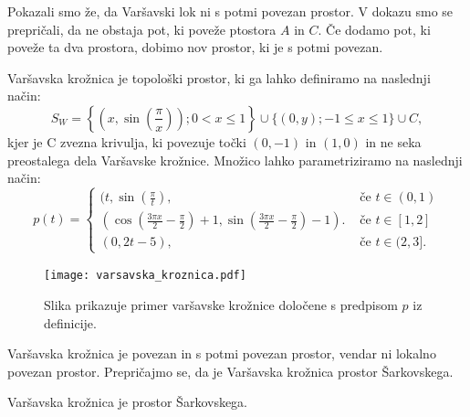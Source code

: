 \documentclass[../TG_magistrsko_delo_sections.tex]{subfiles}
\begin{document}
Pokazali smo že, da Varšavski lok ni s potmi povezan prostor. V dokazu smo se prepričali, da ne obstaja pot, ki poveže ptostora $A$ in $C$. Če dodamo pot, ki poveže ta dva prostora, dobimo nov prostor, ki je s potmi povezan.


\begin{definicija}\label{def:vk}
Varšavska krožnica je topološki prostor, ki ga lahko definiramo na naslednji način:
$$S_W = \left\{\left(x, \sin\left(\frac{\pi}{x}\right)\right); 0 < x \leq 1\right\} \cup \{(0, y); -1 \leq x \leq 1\} \cup C,$$
kjer je C zvezna krivulja, ki povezuje točki $(0,-1)$ in $(1,0)$ in ne seka preostalega dela Varšavske krožnice.
Množico lahko parametriziramo na naslednji način:
\[ p(t) = \begin{cases}
  (t, \sin(\frac{\pi}{t}), & \mbox{ če $t \in (0, 1) $}\\
 (\cos(\frac{3\pi x}{2}-\frac{\pi}{2})+1, \sin(\frac{3\pi x}{2}-\frac{\pi}{2})-1). & \mbox{ če $t \in [1, 2]$}\\
  (0, 2t-5), & \mbox{ če $t \in (2, 3]$.}
  \end{cases}
  \]
\end{definicija}

\begin{figure}[h]
  \centering
  \texttt{[image: varsavska\_kroznica.pdf]}
  \caption[Varšavska krožnica]{Slika prikazuje primer varšavske krožnice določene s predpisom $p$ iz definicije.}
  \label{fig:varsavska-kroznica}
\end{figure}

Varšavska krožnica je povezan in s potmi povezan prostor, vendar ni lokalno povezan prostor. Prepričajmo se, da je Varšavska krožnica prostor Šarkovskega.

\begin{trditev}
Varšavska krožnica je prostor Šarkovskega.
\end{trditev}

\end{document}
